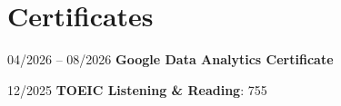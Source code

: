     \section{Certificates}
    \begin{twocolentry}{04/2026 -- 08/2026}
        \textbf{Google Data Analytics Certificate}
    \end{twocolentry}
    \vspace{0.1cm}
    \begin{twocolentry}{12/2025}
        \textbf{TOEIC Listening \& Reading}: 755
    \end{twocolentry}
